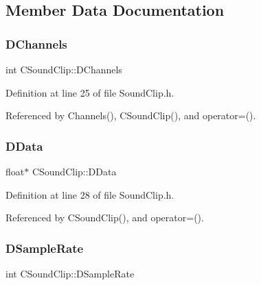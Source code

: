 \subsection{Member Data Documentation}
\hypertarget{classCSoundClip_a01aaf0b87b9b8226c77a6931d03d6a64}{}\label{classCSoundClip_a01aaf0b87b9b8226c77a6931d03d6a64} 
\subsubsection{\texorpdfstring{D\+Channels}{DChannels}}
{\footnotesize\ttfamily int C\+Sound\+Clip\+::\+D\+Channels\hspace{0.3cm}{\ttfamily [protected]}}



Definition at line 25 of file Sound\+Clip.\+h.



Referenced by Channels(), C\+Sound\+Clip(), and operator=().

\hypertarget{classCSoundClip_a220921a0c81e5c63e2cd3c55c75878b1}{}\label{classCSoundClip_a220921a0c81e5c63e2cd3c55c75878b1} 
\subsubsection{\texorpdfstring{D\+Data}{DData}}
{\footnotesize\ttfamily float$\ast$ C\+Sound\+Clip\+::\+D\+Data\hspace{0.3cm}{\ttfamily [protected]}}



Definition at line 28 of file Sound\+Clip.\+h.



Referenced by C\+Sound\+Clip(), and operator=().

\hypertarget{classCSoundClip_ac1b9306140da2f89f6178833e0a9b887}{}\label{classCSoundClip_ac1b9306140da2f89f6178833e0a9b887} 
\subsubsection{\texorpdfstring{D\+Sample\+Rate}{DSampleRate}}
{\footnotesize\ttfamily int C\+Sound\+Clip\+::\+D\+Sample\+Rate\hspace{0.3cm}{\ttfamily [protected]}}



